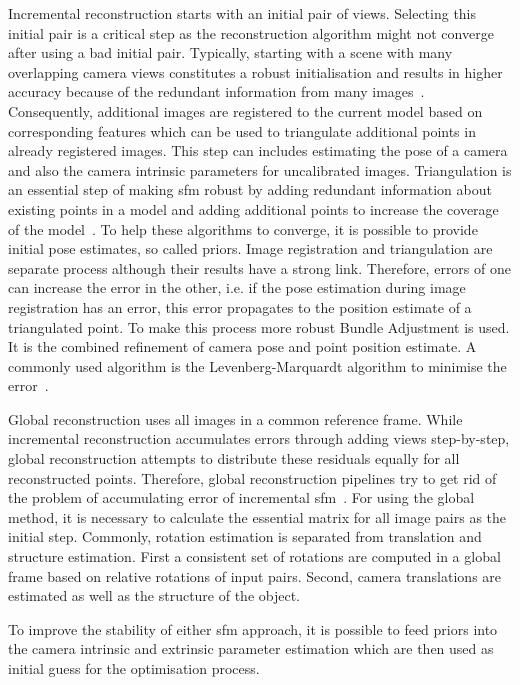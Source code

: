 Incremental reconstruction starts with an initial pair of views. Selecting this initial pair is a critical step as the reconstruction algorithm might not converge after using a bad initial pair. Typically, starting with a scene with many overlapping camera views constitutes a robust initialisation and results in higher accuracy because of the redundant information from many images~\cite{schonberger2016structure}.
Consequently, additional images are registered to the current model based on corresponding features which can be used to triangulate additional points in already registered images. This step can includes estimating the pose of a camera and also the camera intrinsic parameters for uncalibrated images. Triangulation is an essential step of making \gls{sfm} robust by adding redundant information about existing points in a model and adding additional points to increase the coverage of the model~\cite{schonberger2016structure}. To help these algorithms to converge, it is possible to provide initial pose estimates, so called priors.
Image registration and triangulation are separate process although their results have a strong link. Therefore, errors of one can increase the error in the other, i.e. if the pose estimation during image registration has an error, this error propagates to the position estimate of a triangulated point. To make this process more robust Bundle Adjustment is used. It is the combined refinement of camera pose and point position estimate. A commonly used algorithm is the Levenberg-Marquardt algorithm to minimise the error~\cite{schonberger2016structure, Moulon2013AdaptiveEstimation}.

Global reconstruction uses all images in a common reference frame. While incremental reconstruction accumulates errors through adding views step-by-step, global reconstruction attempts to distribute these residuals equally for all reconstructed points. Therefore, global reconstruction pipelines try to get rid of the problem of accumulating error of incremental \gls{sfm}~\cite{Moulon2013GlobalMotion}.
For using the global method, it is necessary to calculate the essential matrix for all image pairs as the initial step. Commonly, rotation estimation is separated from translation and structure estimation. First a consistent set of rotations are computed in a global frame based on relative rotations of input pairs. Second, camera translations are estimated as well as the structure of the object.

To improve the stability of either \gls{sfm} approach, it is possible to feed priors into the camera intrinsic and extrinsic parameter estimation which are then used as initial guess for the optimisation process.

